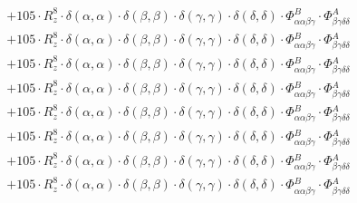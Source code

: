 \documentclass{article}
\begin{document}
\begin{subequations}
\begin{gather}
\begin{array}{c}
 \\[0.2em] 		 + 105 \cdot R_{z}^{8} \cdot \delta{}\left(\alpha{}, \alpha{}\right) \cdot \delta{}\left(\beta{}, \beta{}\right) \cdot \delta{}\left(\gamma{}, \gamma{}\right) \cdot \delta{}\left(\delta{}, \delta{}\right) \cdot \Phi{}^{B}_{\alpha{}\alpha{}\beta{}\gamma{}} \cdot \Phi{}^{A}_{\beta{}\gamma{}\delta{}\delta{}} 
 \\[0.2em] 		 + 105 \cdot R_{z}^{8} \cdot \delta{}\left(\alpha{}, \alpha{}\right) \cdot \delta{}\left(\beta{}, \beta{}\right) \cdot \delta{}\left(\gamma{}, \gamma{}\right) \cdot \delta{}\left(\delta{}, \delta{}\right) \cdot \Phi{}^{B}_{\alpha{}\alpha{}\beta{}\gamma{}} \cdot \Phi{}^{A}_{\beta{}\gamma{}\delta{}\delta{}} 
 \\[0.2em] 		 + 105 \cdot R_{z}^{8} \cdot \delta{}\left(\alpha{}, \alpha{}\right) \cdot \delta{}\left(\beta{}, \beta{}\right) \cdot \delta{}\left(\gamma{}, \gamma{}\right) \cdot \delta{}\left(\delta{}, \delta{}\right) \cdot \Phi{}^{B}_{\alpha{}\alpha{}\beta{}\gamma{}} \cdot \Phi{}^{A}_{\beta{}\gamma{}\delta{}\delta{}} 
 \\[0.2em] 		 + 105 \cdot R_{z}^{8} \cdot \delta{}\left(\alpha{}, \alpha{}\right) \cdot \delta{}\left(\beta{}, \beta{}\right) \cdot \delta{}\left(\gamma{}, \gamma{}\right) \cdot \delta{}\left(\delta{}, \delta{}\right) \cdot \Phi{}^{B}_{\alpha{}\alpha{}\beta{}\gamma{}} \cdot \Phi{}^{A}_{\beta{}\gamma{}\delta{}\delta{}} 
 \\[0.2em] 		 + 105 \cdot R_{z}^{8} \cdot \delta{}\left(\alpha{}, \alpha{}\right) \cdot \delta{}\left(\beta{}, \beta{}\right) \cdot \delta{}\left(\gamma{}, \gamma{}\right) \cdot \delta{}\left(\delta{}, \delta{}\right) \cdot \Phi{}^{B}_{\alpha{}\alpha{}\beta{}\gamma{}} \cdot \Phi{}^{A}_{\beta{}\gamma{}\delta{}\delta{}} 
 \\[0.2em] 		 + 105 \cdot R_{z}^{8} \cdot \delta{}\left(\alpha{}, \alpha{}\right) \cdot \delta{}\left(\beta{}, \beta{}\right) \cdot \delta{}\left(\gamma{}, \gamma{}\right) \cdot \delta{}\left(\delta{}, \delta{}\right) \cdot \Phi{}^{B}_{\alpha{}\alpha{}\beta{}\gamma{}} \cdot \Phi{}^{A}_{\beta{}\gamma{}\delta{}\delta{}} 
 \\[0.2em] 		 + 105 \cdot R_{z}^{8} \cdot \delta{}\left(\alpha{}, \alpha{}\right) \cdot \delta{}\left(\beta{}, \beta{}\right) \cdot \delta{}\left(\gamma{}, \gamma{}\right) \cdot \delta{}\left(\delta{}, \delta{}\right) \cdot \Phi{}^{B}_{\alpha{}\alpha{}\beta{}\gamma{}} \cdot \Phi{}^{A}_{\beta{}\gamma{}\delta{}\delta{}} 
 \\[0.2em] 		 + 105 \cdot R_{z}^{8} \cdot \delta{}\left(\alpha{}, \alpha{}\right) \cdot \delta{}\left(\beta{}, \beta{}\right) \cdot \delta{}\left(\gamma{}, \gamma{}\right) \cdot \delta{}\left(\delta{}, \delta{}\right) \cdot \Phi{}^{B}_{\alpha{}\alpha{}\beta{}\gamma{}} \cdot \Phi{}^{A}_{\beta{}\gamma{}\delta{}\delta{}} 

\end{array}
\end{gather}
\end{subequations}
\end{document}
